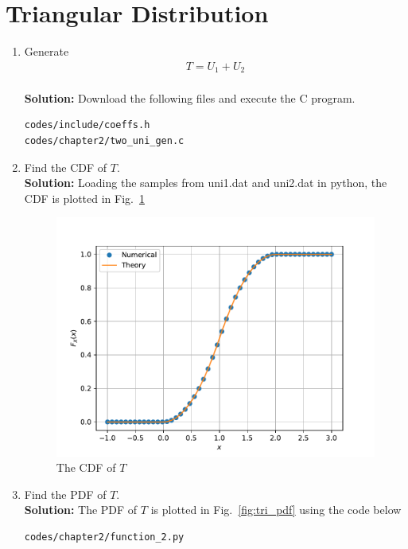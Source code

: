 \documentclass[journal,10pt,twocolumn]{IEEEtran}
\newcommand\figref{Fig.~\ref}
\newcommand{\solution}{\noindent \textbf{Solution: }}
\begin{document}
\section{Triangular Distribution}
%
\begin{enumerate}
\item Generate 
	\begin{align}
		T = U_1+U_2
	\end{align}\\
\solution Download the following files and execute the  C program.
\begin{lstlisting}
codes/include/coeffs.h
codes/chapter2/two_uni_gen.c
\end{lstlisting}
\item Find the CDF of $T$.\\
\solution Loading the samples from uni1.dat and uni2.dat in python, the CDF is plotted in \figref{fig:tri_cdf} 
\begin{figure}[H]
\centering
\includegraphics[width=\columnwidth]{./figs/chapter2/tri_cdf.pdf}
\caption{The CDF of $T$}
\label{fig:tri_cdf}
\end{figure}
\item Find the PDF of $T$.\\
\solution The PDF of $T$ is plotted in \figref{fig:tri_pdf} using the code below
\begin{lstlisting}
codes/chapter2/function_2.py
\end{lstlisting}
\begin{figure}[H]
\centering

\end{figure}
\end{enumerate}
\end{document}
